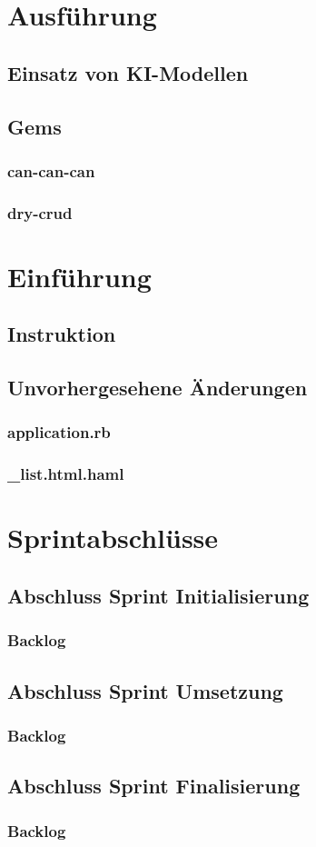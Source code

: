 \chapter{Ausführung}
\section{Einsatz von KI-Modellen}
\section{Gems}
\subsection{can-can-can}
\subsection{dry-crud}

\chapter{Einführung}
\section{Instruktion}

\section{Unvorhergesehene Änderungen}
\subsection{application.rb}
\subsection{\_list.html.haml}

\chapter{Sprintabschlüsse}

\section{Abschluss Sprint Initialisierung}
\subsection{Backlog}

\section{Abschluss Sprint Umsetzung}
\subsection{Backlog}

\section{Abschluss Sprint Finalisierung}
\subsection{Backlog}



